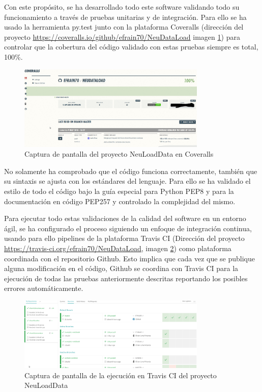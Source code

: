 Con este propósito, se ha desarrollado todo este software validando todo su funcionamiento a través de pruebas unitarias y de integración. Para ello se ha usado la herramienta py.test \cite{Pytest:Documentation} junto con la plataforma Coveralls \cite{CoverallsStatistics} (dirección del proyecto \url{https://coveralls.io/github/efrain70/NeuDataLoad} imagen \ref{figure:coveralls}) para controlar que la cobertura del código validado con estas pruebas siempre es total, 100\%.

\begin{figure}[H]
\centering
\includegraphics[width=0.8\textwidth]{figs/software/HFRiU5.png}
\caption{Captura de pantalla del proyecto NeuLoadData en Coveralls}
\label{figure:coveralls}
\end{figure}

No solamente ha comprobado que el código funciona correctamente, también que su sintaxis se ajusta con los estándares del lenguaje. Para ello se ha validado el estilo de todo el código bajo la guía especial para Python PEP8 \cite{PEPPython.orgb} y para la documentación en código PEP257 \cite{PEPPython.org} y controlado la complejidad del mismo.

Para ejecutar todo estas validaciones de la calidad del software en un entorno ágil, se ha  configurado el proceso siguiendo un enfoque de integración continua, usando para ello pipelines de la plataforma Travis CI \cite{TravisConfidence} (Dirección del proyecto \url{https://travis-ci.org/efrain70/NeuDataLoad}, imagen \ref{figure:travis}) como plataforma coordinada con el repositorio Github. Esto implica que cada vez que se publique alguna modificación en el código, Github se coordina con Travis CI para la ejecución de todas las pruebas anteriormente descritas reportando los posibles errores automáticamente.

\begin{figure}[H]
\centering
\includegraphics[width=0.8\textwidth]{figs/software/travis.png}
\caption{Captura de pantalla de la ejecución en Travis CI del proyecto NeuLoadData}
\label{figure:travis}
\end{figure}

